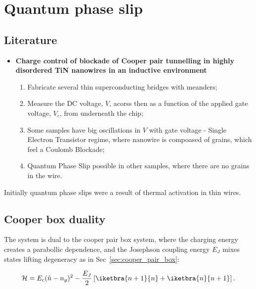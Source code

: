 \newpage

\section{Quantum phase slip \cite{mooij2005} \label{sec:qps}}

\subsection{Literature}
\begin{framed}\noindent
  \begin{itemize}
  \item \textbf{Charge control of blockade  of Cooper pair tunnelling in
      highly disordered TiN nanowires in an inductive environment}
    \begin{enumerate}
    \item Fabricate several thin superconducting bridges with meanders;
    \item Measure the  DC voltage, $ V  $, acorss then as  a function of
      the applied gate voltage, $ V_c $, from underneath the chip;
    \item Some samples have big oscillations  in $ V $ with gate voltage
      - Single  Electron Transistor regime, where  nanowire is compoased
      of grains, which feel a Coulomb Blockade;
    \item Quantum Phase Slip possible  in other samples, where there are
      no grains in the wire.
    \end{enumerate}
  \end{itemize}
\end{framed}

Initially quantum  phase slips  were a result  of thermal  activation in
thin wires.

\subsection{Cooper box duality}
The system  is dual to  the cooper pair  box system, where  the charging
energy  creates  a parabollic  dependence,  and  the Josephson  coupling
energy   $   E_J    $   mixes   states   lifting    degeneracy   as   in
Sec~\ref{sec:cooper_pair_box}:

 \begin{equation}\label{key}
   \mathcal{H} = E_c(\hat{n} - n_g)^2 - \frac{E_J}{2}\left[\iketbra{n+1}{n} + \iketbra{n}{n+1}\right].
 \end{equation}

